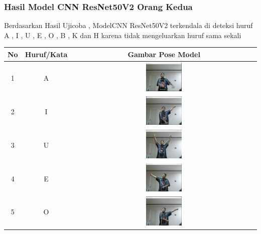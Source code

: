 \subsubsection*{Hasil Model CNN ResNet50V2 Orang Kedua}

Berdasarkan Hasil Ujicoba ,  ModelCNN ResNet50V2 terkendala di deteksi huruf A , I , U , E , O , B , K dan H karena tidak mengeluarkan huruf sama sekali


	\begin{table}[h]
		\centering
		\label{tbl:Tabel Contoh Huruf/Kata dan Gambar Pose Model CNN ResNet50V2 Orang Kedua}
		\begin{tabular}{|c|c|c|}
		\hline
		No & Huruf/Kata & Gambar Pose Model  \\
		\hline
		1 & A & \includegraphics[width=0.2\textwidth]{gambar/bener/HurufA_ModelCNNResNet50V2_Fachry.png} \\
		\hline
		2 & I & \includegraphics[width=0.2\textwidth]{gambar/bener/HurufI_ModelCNNResNet50V2_Fachry.png} \\
		\hline
		3 & U & \includegraphics[width=0.2\textwidth]{gambar/bener/HurufU_ModelCNNResNet50V2_Fachry.png} \\
		\hline
		4 & E & \includegraphics[width=0.2\textwidth]{gambar/bener/HurufE_ModelCNNResNet50V2_Fachry.png} \\
		\hline
		5 & O & \includegraphics[width=0.2\textwidth]{gambar/bener/HurufO_ModelCNNResNet50V2_Fachry.png} \\

\end{tabular}
\end{table}
